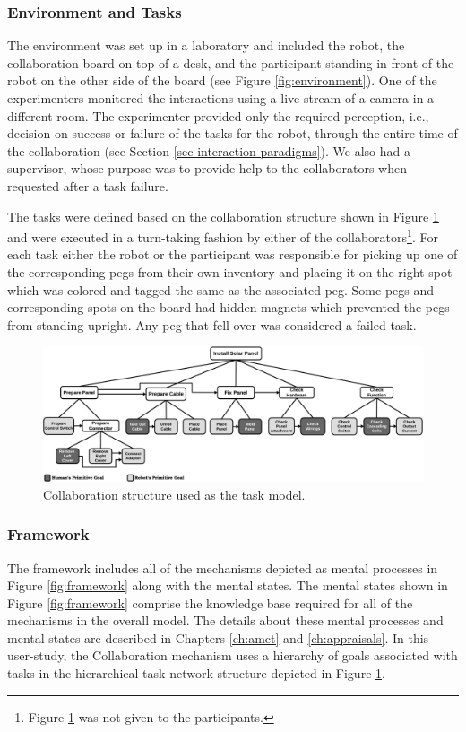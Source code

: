 \documentclass[12pt]{report}
\begin{document}
\subsubsection{Environment and Tasks}

The environment was set up in a laboratory and included the robot, the
collaboration board on top of a desk, and the participant standing in front of
the robot on the other side of the board (see Figure \ref{fig:environment}). One
of the experimenters monitored the interactions using a live stream of a camera
in a different room. The experimenter provided only the required perception,
i.e., decision on success or failure of the tasks for the robot, through the
entire time of the collaboration (see Section \ref{sec-interaction-paradigms}).
{\color{red}We also had a supervisor, whose purpose was to provide help to the
collaborators when requested after a task failure.}

The tasks were defined based on the collaboration structure shown in Figure
\ref{fig:collaboration_structure} and were executed in a turn-taking fashion by
either of the collaborators\footnote{{\color{red}Figure
\ref{fig:collaboration_structure} was not given to the participants.}}. For each
task either the robot or the participant was responsible for picking up one of
the corresponding pegs from their own inventory and placing it on the right spot
which was colored and tagged the same as the associated peg. Some pegs and
corresponding spots on the board had hidden magnets which prevented the pegs
from standing upright. Any peg that fell over was considered a failed task.

\begin{figure}[tbh]
  \centering
  \includegraphics[width=1\textwidth]{figure/collaborationStructure.pdf}
  \caption{Collaboration structure used as the task model.}
  \label{fig:collaboration_structure}
\end{figure}

\subsubsection{Framework}
\label{sec:theory}
The framework includes all of the mechanisms depicted as mental processes in
Figure \ref{fig:framework} along with the mental states. The mental
states shown in Figure \ref{fig:framework} comprise the knowledge base required
for all of the mechanisms in the overall model. The details about these mental
processes and mental states are described in Chapters \ref{ch:amct} and
\ref{ch:appraisals}. In this user-study, the Collaboration mechanism uses a
hierarchy of goals associated with tasks in the hierarchical task network
structure depicted in Figure \ref{fig:collaboration_structure}.
\end{document}
